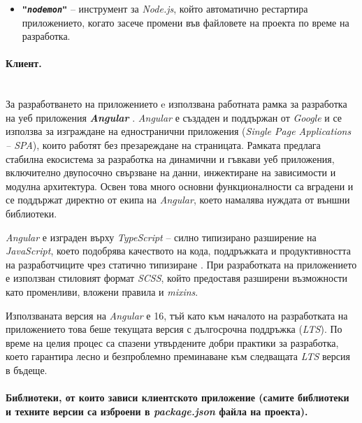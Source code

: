 \begin{itemize}
	\item \texttt{\textbf{"\textit{nodemon}"}} -- инструмент за \textit{Node.js}, който автоматично рестартира приложението, когато засече промени във файловете на проекта по време на разработка.
\end{itemize}

\vspace{-0.75cm}

\paragraph{Клиент.}
\mbox{}\\
За разработването на приложението e използвана работната рамка за разработка на уеб приложения \textbf{\textit{Angular}} \cite{AngularDocs}. \textit{Angular} е създаден и поддържан от \textit{Google} и се използва за изграждане на едностранични приложения (\textit{Single Page Applications -- SPA}), които работят без презареждане на страницата. Рамката предлага стабилна екосистема за разработка на динамични и гъвкави уеб приложения, включително двупосочно свързване на данни, инжектиране на зависимости и модулна архитектура. Освен това много основни функционалности са вградени и се поддържат директно от екипа на \textit{Angular}, което намалява нуждата от външни библиотеки.

\textit{Angular} е изграден върху \textit{TypeScript} -- силно типизирано разширение на \textit{JavaScript}, което подобрява качеството на кода, поддръжката и продуктивността на разработчиците чрез статично типизиране \cite{TypeScriptHandbook}. При разработката на приложението е използван стиловият формат \textit{SCSS}, който предоставя разширени възможности като променливи, вложени правила и \textit{mixins}.

Използваната версия на \textit{Angular} е 16, тъй като към началото на разработката на приложението това беше текущата версия с дългосрочна поддръжка (\textit{LTS}). По време на целия процес са спазени утвърдените добри практики за разработка, което гарантира лесно и безпроблемно преминаване към следващата \textit{LTS} версия в бъдеще.


\paragraph{Библиотеки, от които зависи клиентското приложение (самите библиотеки и техните версии са изброени в \textit{package.json} файла на проекта).}
\mbox{} \\

